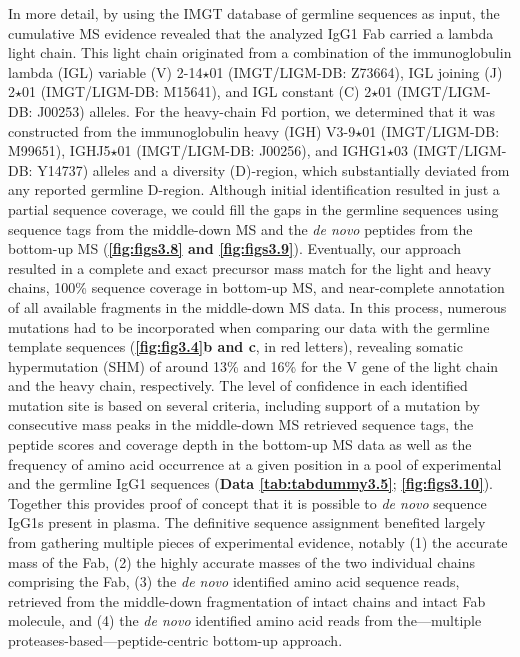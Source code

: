 In more detail, by using the IMGT database of germline sequences as input, the cumulative MS evidence revealed that the analyzed IgG1 Fab carried a lambda light chain. This light chain originated from a combination of the immunoglobulin lambda (IGL) variable (V) 2-14$\star$01 (IMGT/LIGM-DB: Z73664), IGL joining (J) 2$\star$01 (IMGT/LIGM-DB: M15641), and IGL constant (C) 2$\star$01 (IMGT/LIGM-DB: J00253) alleles. For the heavy-chain Fd portion, we determined that it was constructed from the immunoglobulin heavy (IGH) V3-9$\star$01 (IMGT/LIGM-DB: M99651), IGHJ5$\star$01 (IMGT/LIGM-DB: J00256), and IGHG1$\star$03 (IMGT/LIGM-DB: Y14737) alleles and a diversity (D)-region, which substantially deviated from any reported germline D-region. Although initial identification resulted in just a partial sequence coverage, we could fill the gaps in the germline sequences using sequence tags from the middle-down MS and the \emph{de novo} peptides from the bottom-up MS (\textbf{\autoref{fig:figs3.8} and \autoref{fig:figs3.9}}). Eventually, our approach resulted in a complete and exact precursor mass match for the light and heavy chains, 100\% sequence coverage in bottom-up MS, and near-complete annotation of all available fragments in the middle-down MS data. In this process, numerous mutations had to be incorporated when comparing our data with the germline template sequences (\textbf{\autoref{fig:fig3.4}b and c}, in red letters), revealing somatic hypermutation (SHM) of around 13\% and 16\% for the V gene of the light chain and the heavy chain, respectively. The level of confidence in each identified mutation site is based on several criteria, including support of a mutation by consecutive mass peaks in the middle-down MS retrieved sequence tags, the peptide scores and coverage depth in the bottom-up MS data as well as the frequency of amino acid occurrence at a given position in a pool of experimental and the germline IgG1 sequences (\textbf{Data \ref{tab:tabdummy3.5}}; \textbf{\autoref{fig:figs3.10}}). Together this provides proof of concept that it is possible to \emph{de novo} sequence IgG1s present in plasma.
The definitive sequence assignment benefited largely from gathering multiple pieces of experimental evidence, notably (1) the accurate mass of the Fab, (2) the highly accurate masses of the two individual chains comprising the Fab, (3) the \emph{de novo} identified amino acid sequence reads, retrieved from the middle-down fragmentation of intact chains and intact Fab molecule, and (4) the \emph{de novo} identified amino acid reads from the—multiple proteases-based—peptide-centric bottom-up approach.

